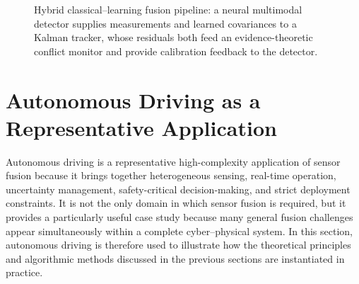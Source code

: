 \documentclass{ieeeaccess}
\begin{document}
{\begin{figure}[!t]
    \centering
    \caption{\color{blue}Hybrid classical--learning fusion pipeline: a neural multimodal detector supplies measurements and learned covariances to a Kalman tracker, whose residuals both feed an evidence-theoretic conflict monitor and provide calibration feedback to the detector.}
    \label{fig:hybrid-pipeline}
\end{figure}
}

\section{Autonomous Driving as a Representative Application}
\label{sec:application}

Autonomous driving is a representative high-complexity application of sensor fusion because it brings together heterogeneous sensing, real-time operation, uncertainty management, safety-critical decision-making, and strict deployment constraints. It is not the only domain in which sensor fusion is required, but it provides a particularly useful case study because many general fusion challenges appear simultaneously within a complete cyber--physical system. In this section, autonomous driving is therefore used to illustrate how the theoretical principles and algorithmic methods discussed in the previous sections are instantiated in practice.
\end{document}
